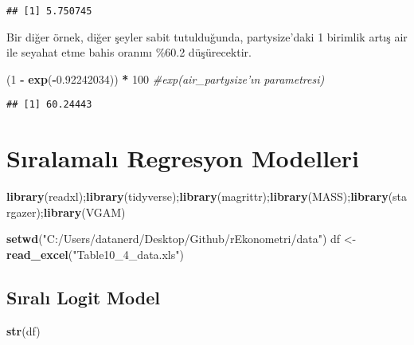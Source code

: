 \documentclass[
]{book}
\newenvironment{Shaded}{\begin{snugshade}}{\end{snugshade}}
\newcommand{\CommentTok}[1]{\textcolor[rgb]{0.56,0.35,0.01}{\textit{#1}}}
\newcommand{\DecValTok}[1]{\textcolor[rgb]{0.00,0.00,0.81}{#1}}
\newcommand{\FloatTok}[1]{\textcolor[rgb]{0.00,0.00,0.81}{#1}}
\newcommand{\KeywordTok}[1]{\textcolor[rgb]{0.13,0.29,0.53}{\textbf{#1}}}
\newcommand{\NormalTok}[1]{#1}
\newcommand{\OperatorTok}[1]{\textcolor[rgb]{0.81,0.36,0.00}{\textbf{#1}}}
\newcommand{\StringTok}[1]{\textcolor[rgb]{0.31,0.60,0.02}{#1}}
\begin{document}
\begin{verbatim}
## [1] 5.750745
\end{verbatim}

Bir diğer örnek, diğer şeyler sabit tutulduğunda, partysize'daki 1 birimlik artış air ile seyahat etme bahis oranını \%60.2 düşürecektir.

\begin{Shaded}
\begin{Highlighting}[]
\NormalTok{(}\DecValTok{1} \OperatorTok{-}\StringTok{ }\KeywordTok{exp}\NormalTok{(}\OperatorTok{-}\FloatTok{0.92242034}\NormalTok{)) }\OperatorTok{*}\StringTok{ }\DecValTok{100} \CommentTok{#exp(air_partysize'ın parametresi)}
\end{Highlighting}
\end{Shaded}

\begin{verbatim}
## [1] 60.24443
\end{verbatim}

\hypertarget{sux131ralamalux131-regresyon-modelleri}{%
\chapter{Sıralamalı Regresyon Modelleri}\label{sux131ralamalux131-regresyon-modelleri}}

\begin{Shaded}
\begin{Highlighting}[]
\KeywordTok{library}\NormalTok{(readxl);}\KeywordTok{library}\NormalTok{(tidyverse);}\KeywordTok{library}\NormalTok{(magrittr);}\KeywordTok{library}\NormalTok{(MASS);}\KeywordTok{library}\NormalTok{(stargazer);}\KeywordTok{library}\NormalTok{(VGAM)}

\KeywordTok{setwd}\NormalTok{(}\StringTok{"C:/Users/datanerd/Desktop/Github/rEkonometri/data"}\NormalTok{)}
\NormalTok{df <-}\StringTok{ }\KeywordTok{read_excel}\NormalTok{(}\StringTok{"Table10_4_data.xls"}\NormalTok{)}
\end{Highlighting}
\end{Shaded}

\hypertarget{sux131ralux131-logit-model}{%
\section{Sıralı Logit Model}\label{sux131ralux131-logit-model}}

\begin{Shaded}
\begin{Highlighting}[]
\KeywordTok{str}\NormalTok{(df)}
\end{Highlighting}
\end{Shaded}
\end{document}
